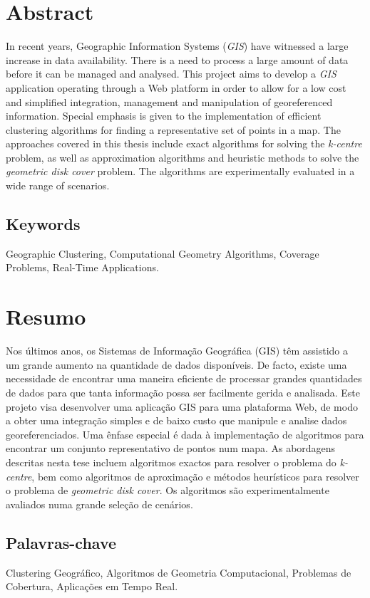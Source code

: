 \setcounter{page}{0}
\vspace*{0.1cm}
\section*{\huge Abstract}

In recent years, Geographic Information Systems (\emph{GIS}) have witnessed a large increase in data availability. There is a need to process a large amount of data before it can be managed and analysed. This project aims to develop a \emph{GIS} application operating through a Web platform in order to allow for a low cost and simplified integration, management and manipulation of georeferenced information. Special emphasis is given to the implementation of efficient clustering algorithms for finding a representative set of points in a map. The approaches covered in this thesis include exact algorithms for solving the \emph{k-centre} problem, as well as approximation algorithms and heuristic methods to solve the \emph{geometric disk cover} problem. The algorithms are experimentally evaluated in a wide range of scenarios.

\subsection*{\large Keywords}

Geographic Clustering, Computational Geometry Algorithms, Coverage Problems, Real-Time Applications.

\vspace*{0.8cm}

\section*{\huge Resumo}

Nos últimos anos, os Sistemas de Informação Geográfica (GIS) têm assistido a um grande aumento na quantidade de dados disponíveis. De facto, existe uma necessidade de encontrar uma maneira eficiente de processar grandes quantidades de dados para que tanta informação possa ser facilmente gerida e analisada. Este projeto visa desenvolver uma aplicação GIS para uma plataforma Web, de modo a obter uma integração simples e de baixo custo que manipule e analise dados georeferenciados. Uma ênfase especial é dada à implementação de algoritmos para encontrar um conjunto representativo de pontos num mapa. As abordagens descritas nesta tese incluem algoritmos exactos para resolver o problema do \emph{k-centre}, bem como algoritmos de aproximação e métodos heurísticos para resolver o problema de \emph{geometric disk cover}. Os algoritmos são experimentalmente avaliados numa grande seleção de cenários.

\subsection*{Palavras-chave}

Clustering Geográfico, Algoritmos de Geometria Computacional, Problemas de Cobertura, Aplicações em Tempo Real.

\vfill